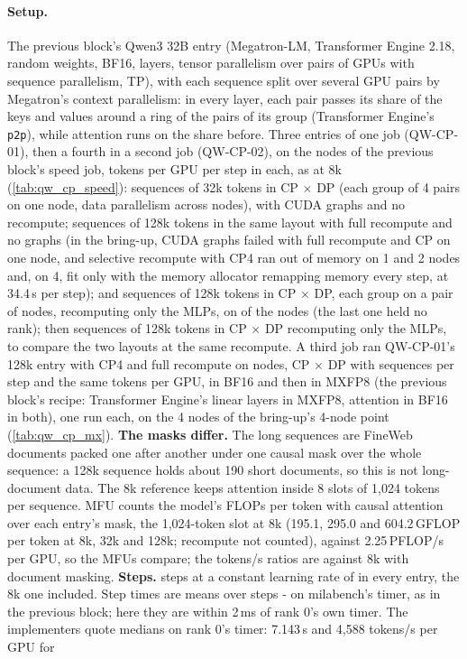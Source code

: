 \paragraph{Setup.} The previous block's Qwen3 32B entry (Megatron-LM, Transformer Engine 2.18, random weights, BF16, \TriQwCpLayers{} layers, tensor parallelism over pairs of GPUs with sequence parallelism, TP\TriQwCpTp), with each sequence split over several GPU pairs by Megatron's context parallelism: in every layer, each pair passes its share of the keys and values around a ring of the pairs of its group (Transformer Engine's \texttt{p2p}), while attention runs on the share before. Three entries of one job (QW-CP-01), then a fourth in a second job (QW-CP-02), on the \TriQwCpNodesThirtyTwo{} nodes of the previous block's speed job, \TriQwCpTokGpu{} tokens per GPU per step in each, as at 8k (\cref{tab:qw_cp_speed}): \TriQwCpSeqsThirtyTwo{} sequences of 32k tokens in CP\TriQwCpSplitThirtyTwo{} $\times$ DP\TriQwCpDpThirtyTwo{} (each group of 4 pairs on one node, data parallelism across nodes), with CUDA graphs and no recompute; \TriQwCpSeqsCpFour{} sequences of 128k tokens in the same layout with full recompute and no graphs (in the bring-up, CUDA graphs failed with full recompute and CP on one node, and selective recompute with CP4 ran out of memory on 1 and 2 nodes and, on 4, fit only with the memory allocator remapping memory every step, at 34.4\,s per step); and \TriQwCpSeqsCpEight{} sequences of 128k tokens in CP\TriQwCpSplitCpEight{} $\times$ DP\TriQwCpDpCpEight, each group on a pair of nodes, recomputing only the MLPs, on \TriQwCpNodesCpEight{} of the nodes (the last one held no rank); then \TriQwCpSeqsCpFourSel{} sequences of 128k tokens in CP\TriQwCpSplitCpFourSel{} $\times$ DP\TriQwCpDpCpFourSel{} recomputing only the MLPs, to compare the two layouts at the same recompute. A third job ran QW-CP-01's 128k entry with CP4 and full recompute on \TriQwCpMxNodes{} nodes, CP\TriQwCpMxSplit{} $\times$ DP\TriQwCpMxDp{} with \TriQwCpMxSeqs{} sequences per step and the same \TriQwCpTokGpu{} tokens per GPU, in BF16 and then in MXFP8 (the previous block's recipe: Transformer Engine's linear layers in MXFP8, attention in BF16 in both), one run each, on the 4 nodes of the bring-up's 4-node point (\cref{tab:qw_cp_mx}). \textbf{The masks differ.} The long sequences are FineWeb documents packed one after another under one causal mask over the whole sequence: a 128k sequence holds about 190 short documents, so this is not long-document data. The 8k reference keeps attention inside 8 slots of 1,024 tokens per sequence. MFU counts the model's FLOPs per token with causal attention over each entry's mask, the 1,024-token slot at 8k (195.1, 295.0 and 604.2\,GFLOP per token at 8k, 32k and 128k; recompute not counted), against 2.25\,PFLOP/s per GPU, so the MFUs compare; the tokens/s ratios are against 8k with document masking. \textbf{Steps.} \TriQwCpSteps{} steps at a constant learning rate of \TriQwCpLr{} in every entry, the 8k one included. Step times are means over steps \TriQwCpFrom-\TriQwCpSteps{} on milabench's timer, as in the previous block; here they are within 2\,ms of rank 0's own timer. The implementers quote medians on rank 0's timer: 7.143\,s and 4,588 tokens/s per GPU for 